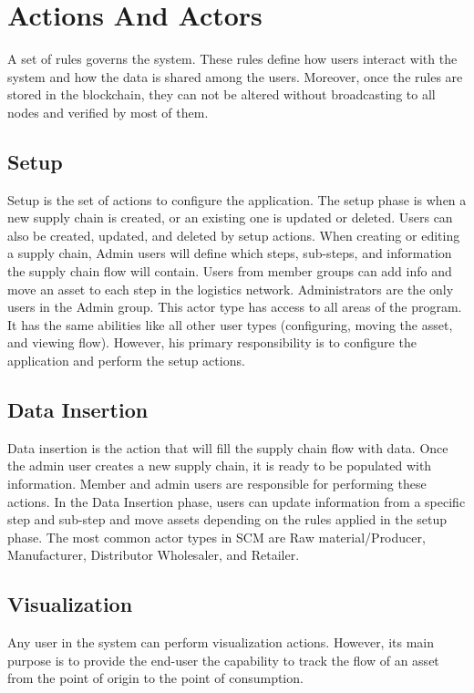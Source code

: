 \section{Actions And Actors}\label{sec:actionsAndActors}

A set of rules governs the system. These rules define how users interact with the system and how the data is shared among the users. Moreover, once the rules are stored in the blockchain, they can not be altered without broadcasting to all nodes and verified by most of them.

\subsection{Setup}\label{sec:Setup}
Setup is the set of actions to configure the application. The setup phase is when a new supply chain is created, or an existing one is updated or deleted. Users can also be created, updated, and deleted by setup actions. When creating or editing a supply chain, Admin users will define which steps, sub-steps, and information the supply chain flow will contain. Users from member groups can add info and move an asset to each step in the logistics network. Administrators are the only users in the Admin group. This actor type has access to all areas of the program. It has the same abilities like all other user types (configuring, moving the asset, and viewing flow). However, his primary responsibility is to configure the application and perform the setup actions.



\subsection{Data Insertion}\label{sec:DataInsertion}

Data insertion is the action that will fill the supply chain flow with data. Once the admin user creates a new supply chain, it is ready to be populated with information. Member and admin users are responsible for performing these actions. In the Data Insertion phase, users can update information from a specific step and sub-step and move assets depending on the rules applied in the setup phase. The most common actor types in SCM are Raw material/Producer, Manufacturer, Distributor Wholesaler, and Retailer.


\subsection{Visualization}\label{sec:Visualization}

Any user in the system can perform visualization actions. However, its main purpose is to provide the end-user the capability to track the flow of an asset from the point of origin to the point of consumption.